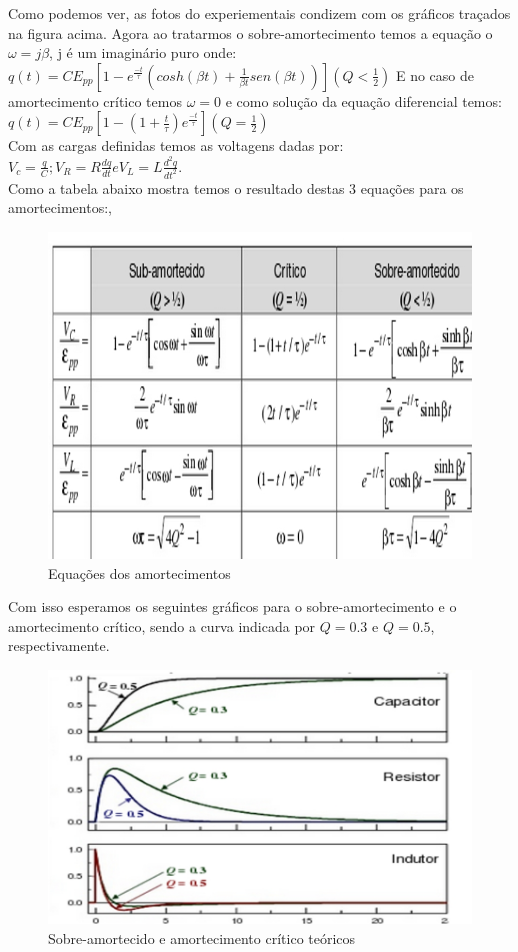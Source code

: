 \documentclass[12pt,letterpaper]{article}
\begin{document}
Como podemos ver, as fotos do experiementais condizem com os gráficos traçados na figura acima.
Agora ao tratarmos o sobre-amortecimento temos a equação o $\omega = j \beta$, j é um imaginário puro onde: $q(t)=C E_{pp}[1 - e^{\frac{-t}{\tau}}(cosh(\beta t)+ \frac{1}{\beta t}sen(\beta t))] (Q < \frac{1}{2}) $ E no caso de amortecimento crítico temos $\omega = 0$ e como solução da equação diferencial temos: $q(t) = C E_{pp}[1 - (1 + \frac{t}{\tau})e^{\frac{-t}{\tau}}] (Q = \frac{1}{2})$\\
Com as cargas definidas temos as voltagens dadas por: $V_c = \frac{q}{C}; V_R = R \frac{dq}{dt} e V_L = L \frac{d^2q}{dt^2}$.\\
Como a tabela abaixo mostra temos o resultado destas 3 equações para os amortecimentos:,
\begin{figure}[!htb]
  \centering
  \label{tabela}
  \includegraphics[scale=0.40]{img/tabela.jpg}
  \caption{Equações dos amortecimentos}
\end{figure}
Com isso esperamos os seguintes gráficos para o sobre-amortecimento e o amortecimento crítico, sendo a curva indicada por $Q = 0.3$ e $Q = 0.5$, respectivamente.
\begin{figure}[!htb]
  \centering
  \label{tabela}
  \includegraphics[scale=0.40]{img/qfig.jpg}
  \caption{Sobre-amortecido e amortecimento crítico teóricos}
\end{figure}
\end{document}
